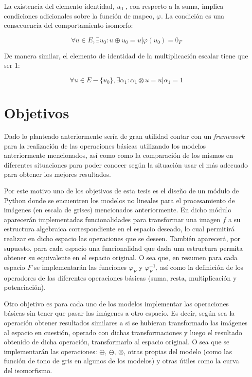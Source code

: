 La existencia del elemento identidad, $u_0$ , con respecto a la suma, implica condiciones adicionales sobre la función de mapeo, $\varphi$. La condición es una consecuencia del comportamiento isomorfo:

\begin{equation}
	\forall u\in E, \exists u_0 : u \oplus u_0 = u | \varphi(u_0)=0_F
\end{equation}


De manera similar, el elemento de identidad de la multiplicación escalar tiene que ser 1:

\begin{equation}
	\forall u \in E - \{u_0\}, \exists \alpha_1 : \alpha_1 \otimes u = u | \alpha_1 = 1
\end{equation}

\section*{Objetivos}

Dado lo planteado anteriormente ser\'ia de gran utilidad contar con un \textit{framework} para la realizaci\'on de las operaciones b\'asicas utilizando los modelos anteriormente mencionados, as\'i como como la comparaci\'on de los mismos en diferentes situaciones para poder conocer seg\'un la situaci\'on usar el m\'as adecuado para obtener los mejores resultados.

Por este motivo uno de los objetivos de esta tesis es el dise\~no de un m\'odulo de Python donde se encuentren los modelos no lineales para el procesamiento de im\'agenes (en escala de grises) mencionados anteriormente. En dicho m\'odulo aparecer\'an implementadas funcionalidades para transformar una imagen $f$ a su estructura algebraica correspondiente en el espacio deseado, lo cual permitir\'a realizar en dicho espacio las operaciones que se deseen. Tambi\'en aparecer\'a, por supuesto, para cada espacio una funcionalidad que dada una estructura permita obtener su equivalente en el espacio original. O sea que, en resumen para cada espacio $F$ se implementar\'an las funciones $\varphi_F$ y $\varphi^{-1}_F$, as\'i como la definici\'on de los operadores de las diferentes operaciones b\'asicas (suma, resta, multiplicaci\'on y potenciaci\'on).

Otro objetivo es para cada uno de los modelos implementar las operaciones b\'asicas sin tener que pasar las im\'agenes a otro espacio. Es decir, seg\'un sea la operaci\'on obtener resultados similares a si se hubieran transformado las im\'agenes al espacio en cuesti\'on, operado con dichas transformaciones y luego el resultado obtenido de dicha operaci\'on, transformarlo al espacio original. O sea que se implementar\'an las operaciones: $\oplus$, $\ominus$, $\otimes$, otras propias del modelo (como las funci\'on de tono de gris en algunos de los modelos) y otras \'utiles como la curva del isomorfismo.

